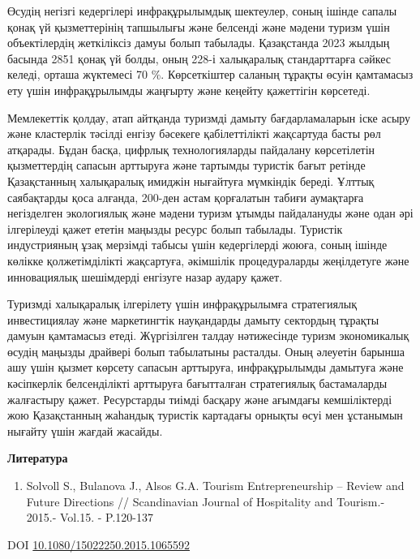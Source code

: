Өсудің негізгі кедергілері инфрақұрылымдық шектеулер, соның ішінде
сапалы қонақ үй қызметтерінің тапшылығы және белсенді және мәдени туризм
үшін объектілердің жеткіліксіз дамуы болып табылады. Қазақстанда 2023
жылдың басында 2851 қонақ үй болды, оның 228-і халықаралық стандарттарға
сәйкес келеді, орташа жүктемесі 70 \%. Көрсеткіштер саланың тұрақты
өсуін қамтамасыз ету үшін инфрақұрылымды жаңғырту және кеңейту
қажеттігін көрсетеді.

Мемлекеттік қолдау, атап айтқанда туризмді дамыту бағдарламаларын іске
асыру және кластерлік тәсілді енгізу бәсекеге қабілеттілікті жақсартуда
басты рөл атқарады. Бұдан басқа, цифрлық технологияларды пайдалану
көрсетілетін қызметтердің сапасын арттыруға және тартымды туристік бағыт
ретінде Қазақстанның халықаралық имиджін нығайтуға мүмкіндік береді.
Ұлттық саябақтарды қоса алғанда, 200-ден астам қорғалатын табиғи
аумақтарға негізделген экологиялық және мәдени туризм ұтымды пайдалануды
және одан әрі ілгерілеуді қажет ететін маңызды ресурс болып табылады.
Туристік индустрияның ұзақ мерзімді табысы үшін кедергілерді жоюға,
соның ішінде көлікке қолжетімділікті жақсартуға, әкімшілік
процедураларды жеңілдетуге және инновациялық шешімдерді енгізуге назар
аудару қажет.

Туризмді халықаралық ілгерілету үшін инфрақұрылымға стратегиялық
инвестициялау және маркетингтік науқандарды дамыту сектордың тұрақты
дамуын қамтамасыз етеді. Жүргізілген талдау нәтижесінде туризм
экономикалық өсудің маңызды драйвері болып табылатыны расталды. Оның
әлеуетін барынша ашу үшін қызмет көрсету сапасын арттыруға,
инфрақұрылымды дамытуға және кәсіпкерлік белсенділікті арттыруға
бағытталған стратегиялық бастамаларды жалғастыру қажет. Ресурстарды
тиімді басқару және ағымдағы кемшіліктерді жою Қазақстанның жаһандық
туристік картадағы орнықты өсуі мен ұстанымын нығайту үшін жағдай
жасайды.

{\bfseries Литература}

\begin{enumerate}
\def\labelenumi{\arabic{enumi}.}
\item
  Solvoll S., Bulanova J., Alsos G.A. Tourism Entrepreneurship -- Review
  and Future Directions // Scandinavian Journal of Hospitality and
  Tourism.- 2015.- Vol.15. - P.120-137
\end{enumerate}

DOI
\href{http://dx.doi.org/10.1080/15022250.2015.1065592}{10.1080/15022250.2015.1065592}

